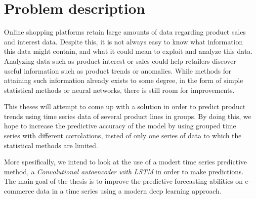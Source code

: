 
\section{Problem description} \label{into:problem-description}
Online shopping platforms retain large amounts of data regarding product sales and interest data.
Despite this, it is not always easy to know what information this data might contain, and what it could mean to exploit and analyze this data.
Analyzing data such as product interest or sales could help retailers discover useful information such as product trends or anomalies.
While methods for attaining such information already exists to some degree, in the form of simple statistical methods or neural networks,
there is still room for improvements.


This theses will attempt to come up with a solution in order to predict product trends using time series data of several product lines in groups.
By doing this, we hope to increase the predictive accuracy of the model by using grouped time series with different corrolations,
insted of only one series of data to which the statistical methods are limited.

More spesifically, we intend to look at the use of a modert time series predictive method, a \textit{Convolutional autoencoder with LSTM} in order to make predictions.
The main goal of the thesis is to improve the predictive forecasting abilities on e-commerce data in a time series using a modern deep learning approach.